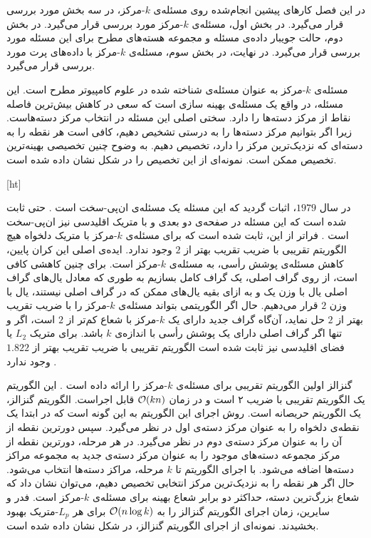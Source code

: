 

در این فصل کارهای پیشین انجام‌شده روی مسئله‌ی $k$-مرکز، در سه بخش مورد بررسی قرار می‌گیرد. در بخش اول، مسئله‌ی $k$-مرکز مورد بررسی قرار می‌گیرد. در بخش دوم، حالت جویبار داده‌ی مسئله و مجموعه هسته‌های مطرح برای این مسئله مورد بررسی قرار می‌گیرد. در نهایت، در بخش سوم، مسئله‌ی $k$-مرکز‌ با داده‌های پرت مورد بررسی قرار می‌گیرد.


مسئله‌ی $k$-مرکز‌ به عنوان مسئله‌ی شناخته شده در علوم کامپیوتر مطرح است. این مسئله، در واقع یک مسئله‌ی بهینه سازی است که سعی در کاهش بیش‌ترین فاصله نقاط از مرکز دسته‌ها را دارد. سختی اصلی این مسئله در انتخاب مرکز دسته‌هاست. زیرا اگر بتوانیم مرکز دسته‌ها را به درستی تشخیص دهیم، کافی است هر نقطه را به دسته‌ای که نزدیک‌ترین مرکز  را دارد، تخصیص دهیم. به وضوح چنین تخصیصی بهینه‌ترین تخصیص ممکن است. نمونه‌ای از این تخصیص را در شکل  نشان داده شده است.

[ht]

در سال $1979$، اثبات گردید که این مسئله یک مسئله‌ی ان‌پی-سخت است . حتی ثابت شده است که این مسئله در صفحه‌ی دو بعدی و با متریک اقلیدسی نیز‌ ان‌پی-سخت است . فراتر از این، ثابت شده است که برای مسئله‌ی $k$-مرکز  با متریک دلخواه هیچ الگوریتم تقریبی با ضریب تقریب بهتر از $2$ وجود ندارد. ایده‌ی اصلی این کران پایین، کاهش مسئله‌ی پوشش‌ رأسی، به مسئله‌ی $k$-مرکز است. برای چنین کاهشی کافی است، از روی گراف اصلی، یک گراف کامل بسازیم به طوری که معادل یال‌های گراف اصلی یال با وزن یک و به ازای بقیه‌ یال‌های ممکن که در گراف اصلی نیستند، یال با وزن $2$ قرار می‌دهیم. حال اگر الگوریتمی بتواند مسئله‌ی $k$-مرکز را با ضریب تقریب بهتر از $2$ حل نماید، آن‌گاه گراف جدید دارای یک $k$-مرکز با شعاع کم‌تر از $2$ است، اگر و تنها اگر گراف اصلی دارای یک پوشش‌ رأسی با اندازه‌ی $k$ باشد. برای متریک $L_2$ یا فضای اقلیدسی نیز‌‌ ثابت شده است الگوریتم تقریبی با ضریب تقریب بهتر از $1.822$ وجود ندارد .

گنزالز اولین الگوریتم تقریبی برای مسئله‌ی $k$-مرکز‌ را ارائه داده است . این الگوریتم یک الگوریتم تقریبی با ضریب ۲ است و در زمان $\mathcal{O}(kn)$ قابل اجراست. الگوریتم گنزالز، یک الگوریتم حریصانه است. روش اجرای این الگوریتم به این گونه است که در ابتدا یک نقطه‌ی دلخواه را به عنوان مرکز‌ دسته‌ی اول در نظر می‌گیرد. سپس دورترین نقطه‌ از آن را به عنوان مرکز دسته‌ی دوم در نظر می‌گیرد. در هر مرحله، دورترین نقطه از مرکز ‌مجموعه دسته‌های موجود را به عنوان مرکز‌ دسته‌ی جدید به مجموعه مراکز‌ دسته‌ها اضافه می‌شود. با اجرای الگوریتم تا $k$ مرحله، مراکز دسته‌ها انتخاب می‌شود. حال اگر هر نقطه را به نزدیک‌ترین مرکز انتخابی تخصیص دهیم، می‌توان نشان داد که شعاع بزرگ‌ترین دسته، حداکثر دو برابر شعاع بهینه‌ برای مسئله‌ی $k$-مرکز است. فدر و سایرین، زمان اجرای الگوریتم گنزالز را به $\mathcal{O}(n \log{k})$ برای هر $L_p$-متریک بهبود بخشیدند. نمونه‌ای از اجرای الگوریتم گنزالز، در شکل  نشان داده شده است.

